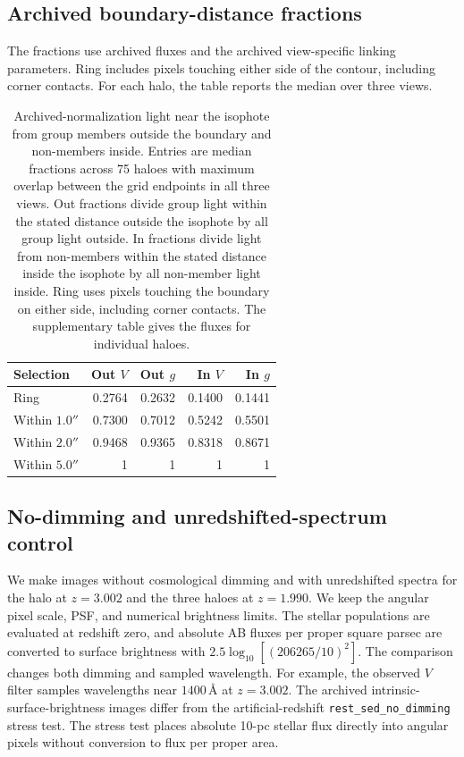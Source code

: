\documentclass[usenatbib]{mnras}
\begin{document}
\subsection{Archived boundary-distance fractions}
The fractions use archived fluxes and the archived view-specific linking
parameters. Ring includes pixels touching either side of the contour,
including corner contacts. For each halo, the table reports the median
over three views.
\begin{table}
\centering
\caption{Archived-normalization light near the isophote from group members outside the boundary
and non-members inside. Entries are median fractions across 75 haloes
with maximum overlap between the grid endpoints in all three views.
Out fractions divide group light within the stated distance outside
the isophote by all group light outside. In fractions divide light
from non-members within the stated distance inside the isophote by all
non-member light inside. Ring uses pixels touching the boundary on
either side, including corner contacts. The supplementary table gives
the fluxes for individual haloes.}
\label{supp:boundarydistance}
\small
\begin{tabular}{lrrrr}
\toprule
Selection & Out $V$ & Out $g$ & In $V$ & In $g$ \\
\midrule
Ring & 0.2764 & 0.2632 & 0.1400 & 0.1441 \\
Within $1.0''$ & 0.7300 & 0.7012 & 0.5242 & 0.5501 \\
Within $2.0''$ & 0.9468 & 0.9365 & 0.8318 & 0.8671 \\
Within $5.0''$ & 1 & 1 & 1 & 1 \\
\bottomrule
\end{tabular}
\end{table}

\subsection{No-dimming and unredshifted-spectrum control}
\label{supp:rest-control}

We make images without cosmological dimming and with unredshifted
spectra for the halo at $z=3.002$ and the three haloes at $z=1.990$.
We keep the angular pixel scale, PSF, and numerical brightness limits.
The stellar populations are evaluated at redshift zero, and absolute
AB fluxes per proper square parsec are converted to surface brightness
with $2.5\log_{10}[(206265/10)^{2}]$.
The comparison changes both dimming and sampled wavelength.
For example, the observed $V$ filter samples wavelengths near
$1400\,\text{\AA}$ at $z=3.002$.
The archived intrinsic-surface-brightness images differ from the
artificial-redshift \texttt{rest\_sed\_no\_dimming} stress test. The stress
test places absolute 10-pc stellar flux directly into angular pixels
without conversion to flux per proper area.
\end{document}
